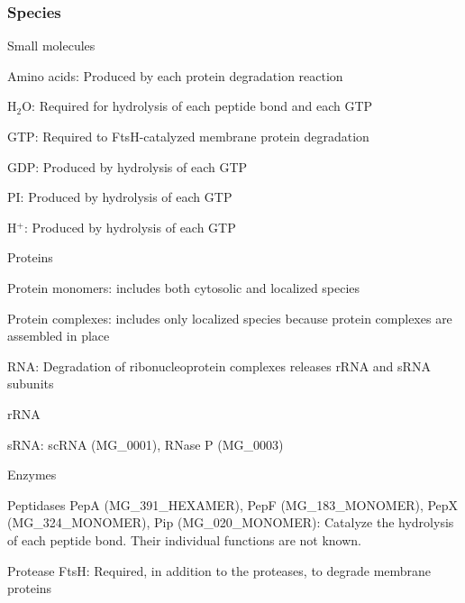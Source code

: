 \documentclass[10pt]{article}
\begin{document}
\subsubsection{Species}
\begin{compactitem}
\item Small molecules
    \begin{compactitem}
    \item Amino acids: Produced by each protein degradation reaction
    \item H$_\text{2}$O: Required for hydrolysis of each peptide bond and each GTP
    \item GTP: Required to FtsH-catalyzed membrane protein degradation
    \item GDP: Produced by hydrolysis of each GTP 
    \item PI: Produced by hydrolysis of each GTP
    \item H$^\text{+}$: Produced by hydrolysis of each GTP
    \end{compactitem}
\item Proteins
    \begin{compactitem}
    \item Protein monomers: includes both cytosolic and localized species
    \item Protein complexes: includes only localized species because protein complexes are assembled in place
    \end{compactitem}
\item RNA: Degradation of ribonucleoprotein complexes releases rRNA and sRNA subunits
    \begin{compactitem}
    \item rRNA
    \item sRNA: scRNA (MG\_0001), RNase P (MG\_0003)
    \end{compactitem}
\item Enzymes
    \begin{compactitem}
    \item Peptidases PepA (MG\_391\_HEXAMER), PepF (MG\_183\_MONOMER), PepX (MG\_324\_MONOMER), Pip (MG\_020\_MONOMER): Catalyze the hydrolysis of each peptide bond. Their individual functions are not known.
    \item Protease FtsH: Required, in addition to the proteases, to degrade membrane proteins
    \end{compactitem}
\end{compactitem}
\end{document}
